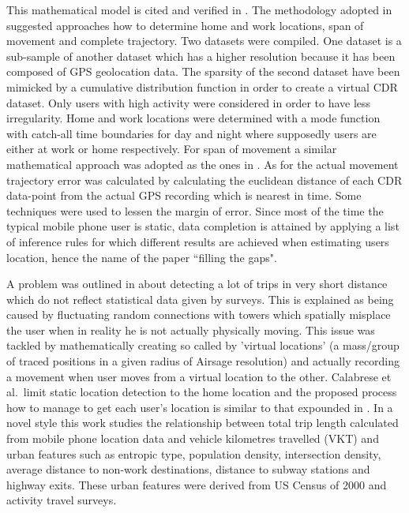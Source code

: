 \documentclass[12pt, a4paper]{report}
\theoremstyle{definition}
\theoremstyle{definition}%
\theoremstyle{definition}%
\theoremstyle{definition}%
\theoremstyle{definition}%
\theoremstyle{definition}%
\begin{document}
This mathematical model is cited and verified in \cite{Calabrese2013}. The methodology adopted in \cite{Hoteit2016} suggested approaches how to determine home and work locations, span of movement and complete trajectory. Two datasets were compiled. One dataset is a sub-sample of another dataset which has a higher resolution because it has been composed of GPS geolocation data. The sparsity of the second dataset have been mimicked by a cumulative distribution function in order to create a virtual CDR dataset. Only users with high activity were considered in order to have less irregularity. Home and work locations were determined with a mode function with catch-all time boundaries for day and night where supposedly users are either at work or home respectively. For span of movement a similar mathematical approach was adopted as the ones in \cite{Hoteit2014,Gonzalez2008}. As for the actual movement trajectory error was calculated by calculating the euclidean distance of each CDR data-point from the actual GPS recording which is nearest in time.
Some techniques were used to lessen the margin of error. Since most of the time the typical mobile phone user is static, data completion is attained by applying a list of inference rules for which different results are achieved when estimating users location, hence the name of the paper ``filling the gaps".

A problem was outlined in \cite{Calabrese2013} about detecting a lot of trips in very short distance which do not reflect statistical data given by surveys. This is explained as being caused by fluctuating random connections with towers which spatially misplace the user when in reality he is not actually physically moving. This issue was tackled by mathematically creating so called by \cite{Calabrese2013} 'virtual locations' (a mass/group of traced positions in a given radius of Airsage resolution) and actually recording a movement when user moves from a virtual location to the other. Calabrese et al.\ limit static location detection to the home location and the proposed process how to manage to get each user's location is similar to that expounded in \cite{Hoteit2016}. In a novel style this work studies the relationship between total trip length calculated from mobile phone location data and vehicle kilometres travelled (VKT) and urban features such as entropic type, population density, intersection density, average distance to non-work destinations, distance to subway stations and highway exits. These urban features were derived from US Census of 2000 and activity travel surveys.
\end{document}
